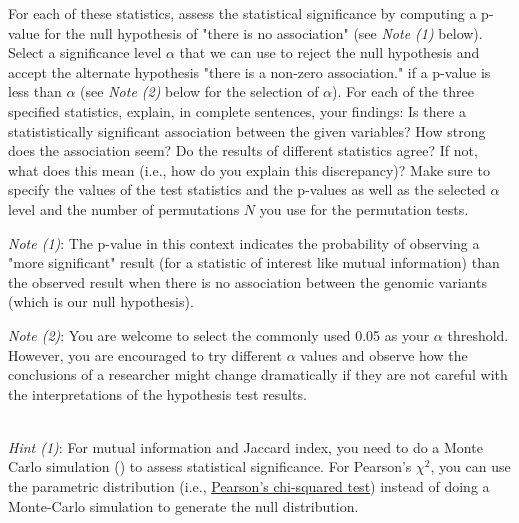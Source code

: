 \documentclass[11pt]{article}
\begin{document}
\noindent
For each of these statistics, assess the statistical significance by computing a p-value for the null hypothesis of "there is no association" (see \textit{Note (1)} below). %
Select a significance level $\alpha$ that we can use to reject the null hypothesis and accept the alternate hypothesis "there is a non-zero association." if a p-value is less than $\alpha$ (see \textit{Note (2)} below for the selection of $\alpha$). For each of the three specified statistics, explain, in complete sentences, your findings: Is there a statististically significant association between the given variables? How strong does the association seem? Do the results of different statistics agree? If not, what does this mean (i.e., how do you explain this discrepancy)? Make sure to specify the values of the test statistics and the p-values as well as the selected $\alpha$ level and the number of permutations $N$ you use for the permutation tests.

\vspace{0.2cm}
\noindent
\textit{Note (1)}: The p-value in this context indicates the probability of observing a "more significant" result (for a statistic of interest like mutual information) than the observed result when there is no association between the genomic variants (which is our null hypothesis). 

\vspace{0.2cm}
\noindent
\textit{Note (2)}: You are welcome to select the commonly used 0.05 as your $\alpha$ threshold. However, you are encouraged to try different $\alpha$ values and observe how the conclusions of a researcher might change dramatically if they are not careful with the interpretations of the hypothesis test results.

\noindent
\\
\textit{Hint (1)}: For mutual information and Jaccard index, you need to do a Monte Carlo simulation () to assess statistical significance. For Pearson's $\chi^2$, you can use the parametric distribution (i.e., \href{https://en.wikipedia.org/wiki/Pearson\%27s_chi-squared_test\#Testing\_for\_statistical_independence}{Pearson's chi-squared test}) instead of doing a Monte-Carlo simulation to generate the null distribution.
\end{document}
